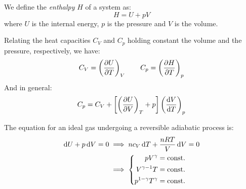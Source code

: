 \documentclass[../../../main.tex]{subfiles}
\begin{document}
\begin{multicols}{2}
\begin{definition}
  \end{definition}
  \begin{definition}[Enthalpy]
    We define the \emph{enthalpy} $H$ of a system as: $$H=U+pV$$
    where $U$ is the internal energy, $p$ is the pressure and $V$ is the volume.
  \end{definition}
  \begin{proposition}
    Relating the heat capacities $C_V$ and $C_p$ holding constant the volume and the pressure, respectively, we have:
    $$C_V=\left(\pdv{U}{T}\right)_V\qquad C_p=\left(\pdv{H}{T}\right)_p$$
    And in general:
    $$C_p=C_V+\left[\left(\pdv{U}{V}\right)_T+p\right]\left(\dv{V}{T}\right)_p$$
  \end{proposition}
  \begin{proposition}
    The equation for an ideal gas undergoing a reversible adiabatic process is:
    \begin{align*}
      \dd{U}+p\dd{V}=0 & \implies nc_V\dd{T}+\frac{nRT}{V}\dd{V}=0 \\
                       & \implies\left\{
      \begin{aligned}
        pV^\gamma            & =\text{const.} \\
        V^{\gamma-1} T       & =\text{const.} \\
        p^{1-\gamma}T^\gamma & =\text{const.}
      \end{aligned}\right.
    \end{align*}
  \end{proposition}

\end{multicols}
\end{document}
